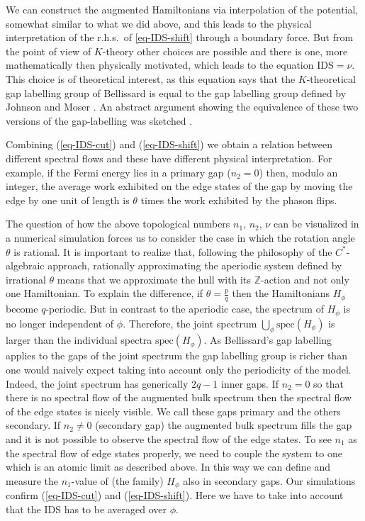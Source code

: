 \documentclass[11pt]{amsart}
\newcommand{\Z}{\mathbb{Z}}
\begin{document}
We can construct the augmented Hamiltonians via interpolation of the potential, somewhat similar to what we did above, and this leads to the physical interpretation of the r.h.s.\ of \eqref{eq-IDS-shift} through a boundary force. But from the point of view of $K$-theory other choices are possible and there is one, more mathematically then physically motivated, which leads to the equation $\mathrm{IDS} = \nu$. This choice is of theoretical interest, as this equation  says that the $K$-theoretical gap labelling group of Bellissard \cite{Bellissard} is equal to the gap labelling group defined by Johnson and Moser \cite{johnson1982rotation,johnson1986exponential}. An abstract argument showing the equivalence of these two versions of the gap-labelling was sketched \cite{bellissard1992gap}.


Combining (\ref{eq-IDS-cut}) and (\ref{eq-IDS-shift}) we obtain a relation between different spectral flows and these have different physical interpretation. For example, if the Fermi energy lies in a primary gap ($n_2=0$) then, modulo an integer, the average work exhibited on the edge states of the gap by moving the edge by one unit of length is $\theta$ times the work exhibited by the phason flips.
\bigskip

The question of how the above topological numbers $n_1$, $n_2$, $\nu$ can be visualized in a numerical simulation forces us to consider 
the case in which the rotation angle $\theta$ is rational. It is important to realize that, following the philosophy of the $C^*$-algebraic approach, rationally approximating the aperiodic system defined by irrational $\theta$
means that we approximate the hull with its $\Z$-action and not only one Hamiltonian. To explain the difference, if $\theta=\frac{p}{q}$ then the Hamiltonians $H_\phi$ become $q$-periodic. But in contrast to the aperiodic case, the spectrum of $H_\phi$ is no longer independent of $\phi$. 
Therefore, the joint spectrum 
$\bigcup_{\phi} \mathrm{spec}(H_\phi)$ is larger than the individual spectra $\mathrm{spec}(H_\phi)$. As Bellissard's gap labelling applies to the gaps of the joint spectrum the gap labelling group is richer than one would naively expect taking into account only the periodicity of the model. Indeed, the joint spectrum has generically $2q-1$ inner gaps. 
If $n_2=0$ so that there is no spectral flow of the augmented bulk spectrum then the spectral flow of the edge states is nicely visible. We call these gaps primary and the others secondary.
If $n_2\neq 0$ (secondary gap) the augmented bulk spectrum fills the gap and it is not possible to observe the spectral flow of the edge states. To see $n_1$ as the spectral flow of edge states properly, we need to couple the system to one which is an atomic limit as described above. 
In this way we can define and measure the $n_1$-value of (the family) $H_\phi$ also in secondary gaps.
Our simulations confirm (\ref{eq-IDS-cut}) and (\ref{eq-IDS-shift}). Here we have to take into account that the IDS has to be averaged over $\phi$. 
\end{document}
